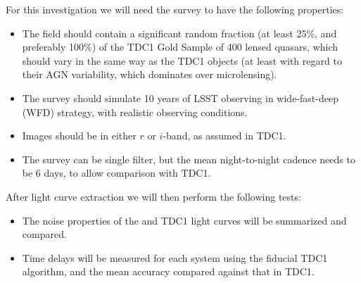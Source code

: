 For this investigation we will need the \TwinklesOne survey to have the following
properties:
\begin{itemize}
\item The field should contain a significant random fraction (at least
25\%,  and preferably 100\%) of the TDC1 Gold Sample of 400 lensed
quasars,  which should vary in the same way as the TDC1 objects (at
least with regard to their  AGN variability, which dominates over
microlensing).
\item The survey should simulate 10 years of LSST observing in
wide-fast-deep (WFD) strategy, with realistic observing conditions.
\item Images should be in either $r$ or $i$-band, as assumed in TDC1.
\item The survey can be single filter, but the mean night-to-night
cadence needs to be 6 days, to allow comparison with TDC1.
\end{itemize}

After light curve extraction we will then perform the following tests:
\begin{itemize}
\item The noise properties of the \TwinklesOne and TDC1 light curves
will be summarized and compared.
\item Time delays will be measured for each system using the fiducial
TDC1 algorithm, and the mean accuracy compared against that in TDC1.
\end{itemize}


